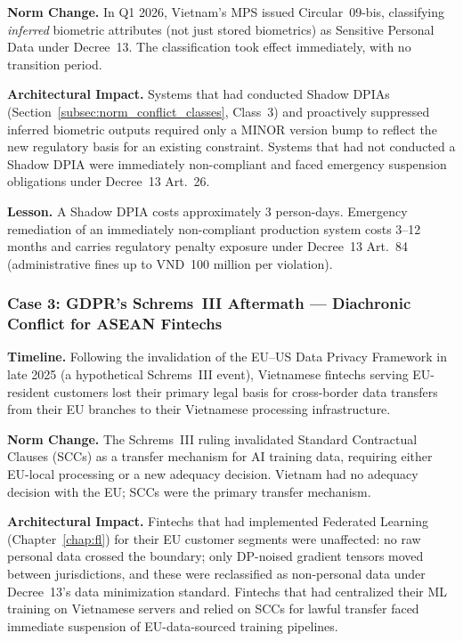 \textbf{Norm Change.} In Q1 2026, Vietnam's MPS issued Circular~09-bis, classifying \emph{inferred} biometric attributes (not just stored biometrics) as Sensitive Personal Data under Decree~13. The classification took effect immediately, with no transition period.

\textbf{Architectural Impact.} Systems that had conducted Shadow DPIAs (Section~\ref{subsec:norm_conflict_classes}, Class~3) and proactively suppressed inferred biometric outputs required only a MINOR version bump to reflect the new regulatory basis for an existing constraint. Systems that had not conducted a Shadow DPIA were immediately non-compliant and faced emergency suspension obligations under Decree~13 Art.~26.

\textbf{Lesson.} A Shadow DPIA costs approximately 3 person-days. Emergency remediation of an immediately non-compliant production system costs 3--12 months and carries regulatory penalty exposure under Decree~13 Art.~84 (administrative fines up to VND~100 million per violation).

\subsubsection*{Case 3: GDPR's Schrems~III Aftermath --- Diachronic Conflict for ASEAN Fintechs}

\textbf{Timeline.} Following the invalidation of the EU--US Data Privacy Framework in late 2025 (a hypothetical Schrems~III event), Vietnamese fintechs serving EU-resident customers lost their primary legal basis for cross-border data transfers from their EU branches to their Vietnamese processing infrastructure.

\textbf{Norm Change.} The Schrems~III ruling invalidated Standard Contractual Clauses (SCCs) as a transfer mechanism for AI training data, requiring either EU-local processing or a new adequacy decision. Vietnam had no adequacy decision with the EU; SCCs were the primary transfer mechanism.

\textbf{Architectural Impact.} Fintechs that had implemented Federated Learning (Chapter~\ref{chap:fl}) for their EU customer segments were unaffected: no raw personal data crossed the boundary; only DP-noised gradient tensors moved between jurisdictions, and these were reclassified as non-personal data under Decree~13's data minimization standard. Fintechs that had centralized their ML training on Vietnamese servers and relied on SCCs for lawful transfer faced immediate suspension of EU-data-sourced training pipelines.

